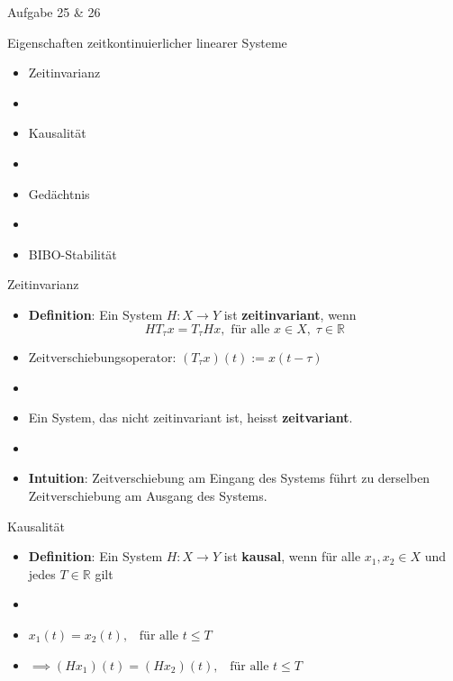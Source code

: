 \documentclass[14pt, aspectratio=169, handout]{beamer}
\begin{document}
\begin{frame}{Aufgabe 25 \& 26}
    
\end{frame}

\begin{frame}{Eigenschaften zeitkontinuierlicher linearer Systeme}
    \begin{itemize}
        \item Zeitinvarianz
        \item[] 
        \item Kausalität
        \item[] 
        \item Gedächtnis
        \item[] 
        \item BIBO-Stabilität
    \end{itemize}
\end{frame}

\begin{frame}{Zeitinvarianz}
    \begin{itemize}
        \item \textbf{Definition}: Ein System $H:X \to Y$ ist \textbf{zeitinvariant}, wenn
        $$HT_\tau x = T_\tau Hx, \text{ für alle } x \in X, \; \tau \in \mathbb{R}$$
        \item[] Zeitverschiebungsoperator: $(T_\tau x)(t) := x(t-\tau)$ 
        \item[] 
        \item Ein System, das nicht zeitinvariant ist, heisst \textbf{zeitvariant}.
        \item[] 
        \item \textbf{Intuition}: Zeitverschiebung am Eingang des Systems führt zu derselben Zeitverschiebung am Ausgang des Systems.
    \end{itemize}
\end{frame}

\begin{frame}{Kausalität}
    \begin{itemize}
        \item \textbf{Definition}: Ein System $H:X \to Y$ ist \textbf{kausal}, wenn für alle $x_1, x_2 \in X$ und jedes $T\in \mathbb{R}$ gilt
        \item[] 
        \item[] $x_1(t) = x_2(t), \hspace{10pt} \text{für alle } t \leq T $
        \item[] \vspace{0.25cm}$\implies (Hx_1)(t) = (Hx_2)(t), \hspace{10pt} \text{für alle } t \leq T$
    \end{itemize}
\end{frame}
\end{document}
